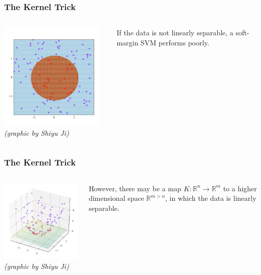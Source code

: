 \documentclass[mathserif,serif]{beamer}
\begin{document}
\begin{frame}
  \frametitle{The Kernel Trick}
  \begin{columns}
    \centering
    \includegraphics[width=5cm]{not_linear}
    \textit{\tiny(graphic by Shiyu Ji)}

    If the data is not linearly separable, a soft-margin SVM performs poorly.
  \end{columns}
\end{frame}

\begin{frame}
  \frametitle{The Kernel Trick}
  \begin{columns}
    \centering
    \includegraphics[width=5cm]{kernel_trick}
    \textit{\tiny(graphic by Shiyu Ji)}

    However, there may be a map $K: \mathbb{R}^n \to \mathbb{R}^m$ to a higher dimensional space
    $\mathbb{R}^{m>n}$, in which the data is linearly separable.
  \end{columns}
\end{frame}
\end{document}
